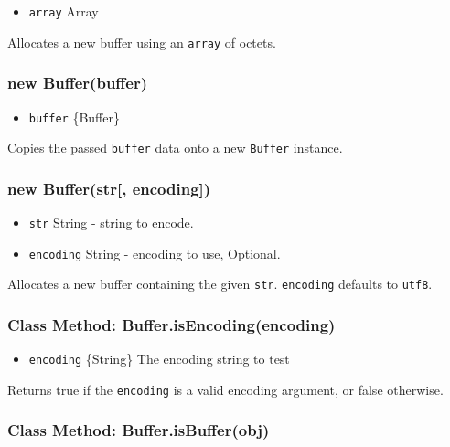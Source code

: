\begin{itemize}
\itemsep1pt\parskip0pt
\item
  \texttt{array} Array
\end{itemize}

Allocates a new buffer using an \texttt{array} of octets.

\subsubsection{new Buffer(buffer)}\label{new-bufferbuffer}

\begin{itemize}
\itemsep1pt\parskip0pt
\item
  \texttt{buffer} \{Buffer\}
\end{itemize}

Copies the passed \texttt{buffer} data onto a new \texttt{Buffer}
instance.

\subsubsection{new Buffer(str{[},
encoding{]})}\label{new-bufferstr-encoding}

\begin{itemize}
\itemsep1pt\parskip0pt
\item
  \texttt{str} String - string to encode.
\item
  \texttt{encoding} String - encoding to use, Optional.
\end{itemize}

Allocates a new buffer containing the given \texttt{str}.
\texttt{encoding} defaults to
\texttt{\textquotesingle{}utf8\textquotesingle{}}.

\subsubsection{Class Method:
Buffer.isEncoding(encoding)}\label{class-method-buffer.isencodingencoding}

\begin{itemize}
\itemsep1pt\parskip0pt
\item
  \texttt{encoding} \{String\} The encoding string to test
\end{itemize}

Returns true if the \texttt{encoding} is a valid encoding argument, or
false otherwise.

\subsubsection{Class Method:
Buffer.isBuffer(obj)}\label{class-method-buffer.isbufferobj}

